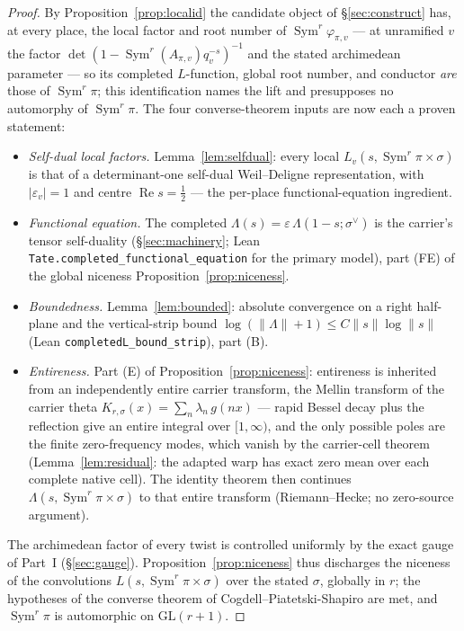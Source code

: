 \documentclass[11pt]{article}
\theoremstyle{definition}
\renewcommand{\Re}{\operatorname{Re}}
\newcommand{\Sym}{\operatorname{Sym}}
\begin{document}
\begin{proof}
By Proposition~\ref{prop:localid} the candidate object of \S\ref{sec:construct} has, at every place, the
local factor and root number of $\Sym^r\varphi_{\pi,v}$ --- at unramified $v$ the factor
$\det(1-\Sym^r(A_{\pi,v})q_v^{-s})^{-1}$ and the stated archimedean parameter --- so its completed
$L$-function, global root number, and conductor \emph{are} those of $\Sym^r\pi$; this identification names
the lift and presupposes no automorphy of $\Sym^r\pi$. The four converse-theorem inputs are now each a
proven statement:
\begin{itemize}
\item[$\bullet$] \emph{Self-dual local factors.} Lemma~\ref{lem:selfdual}: every local
$L_v(s,\Sym^r\pi\times\sigma)$ is that of a determinant-one self-dual Weil--Deligne representation, with
$|\varepsilon_v|=1$ and centre $\Re s=\tfrac12$ --- the per-place functional-equation ingredient.
\item[$\bullet$] \emph{Functional equation.} The completed $\Lambda(s)=\varepsilon\,\Lambda(1-s;\sigma^\vee)$
is the carrier's tensor self-duality (\S\ref{sec:machinery}; Lean
\texttt{Tate.completed\_functional\_equation} for the primary model), part \textup{(FE)} of the global
niceness Proposition~\ref{prop:niceness}.
\item[$\bullet$] \emph{Boundedness.} Lemma~\ref{lem:bounded}: absolute convergence on a right half-plane and
the vertical-strip bound $\log(\|\Lambda\|+1)\le C\|s\|\log\|s\|$ (Lean
\texttt{completedL\_bound\_strip}), part \textup{(B)}.
\item[$\bullet$] \emph{Entireness.} Part \textup{(E)} of Proposition~\ref{prop:niceness}: entireness is
inherited from an independently entire carrier transform, the Mellin transform of the carrier theta
$K_{r,\sigma}(x)=\sum_n\lambda_n\,g(nx)$ --- rapid Bessel decay plus the reflection give an entire integral
over $[1,\infty)$, and the only possible poles are the finite zero-frequency modes, which vanish by the
carrier-cell theorem (Lemma~\ref{lem:residual}: the adapted warp has exact zero mean over each complete
native cell). The identity theorem then continues $\Lambda(s,\Sym^r\pi\times\sigma)$ to that entire
transform (Riemann--Hecke; no zero-source argument).
\end{itemize}
The archimedean factor of every twist is controlled uniformly by the exact gauge of Part~I
(\S\ref{sec:gauge}). Proposition~\ref{prop:niceness} thus discharges the niceness of the convolutions
$L(s,\Sym^r\pi\times\sigma)$ over the stated $\sigma$, globally in $r$; the hypotheses of the converse
theorem of Cogdell--Piatetski-Shapiro \cite{CPS} are met, and $\Sym^r\pi$ is automorphic on
$\mathrm{GL}(r+1)$.
\end{proof}
\end{document}
